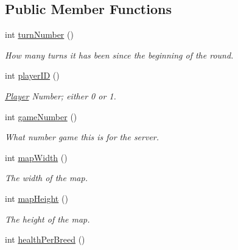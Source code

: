 \subsection*{\-Public \-Member \-Functions}
\begin{DoxyCompactItemize}
\item 
\hypertarget{classBaseAI_a19ade7391bfe101884a35f48fb840199}{int \hyperlink{classBaseAI_a19ade7391bfe101884a35f48fb840199}{turn\-Number} ()}\label{classBaseAI_a19ade7391bfe101884a35f48fb840199}

\begin{DoxyCompactList}\small\item\em \-How many turns it has been since the beginning of the round. \end{DoxyCompactList}\item 
\hypertarget{classBaseAI_a16aab1036653c8f8fb5370cf2f6a3e10}{int \hyperlink{classBaseAI_a16aab1036653c8f8fb5370cf2f6a3e10}{player\-I\-D} ()}\label{classBaseAI_a16aab1036653c8f8fb5370cf2f6a3e10}

\begin{DoxyCompactList}\small\item\em \hyperlink{classPlayer}{\-Player} \-Number; either 0 or 1. \end{DoxyCompactList}\item 
\hypertarget{classBaseAI_a50d3091db33b93c6f7c2d11dd64b4c7a}{int \hyperlink{classBaseAI_a50d3091db33b93c6f7c2d11dd64b4c7a}{game\-Number} ()}\label{classBaseAI_a50d3091db33b93c6f7c2d11dd64b4c7a}

\begin{DoxyCompactList}\small\item\em \-What number game this is for the server. \end{DoxyCompactList}\item 
\hypertarget{classBaseAI_acef275d421ba8018d14071a1383b3769}{int \hyperlink{classBaseAI_acef275d421ba8018d14071a1383b3769}{map\-Width} ()}\label{classBaseAI_acef275d421ba8018d14071a1383b3769}

\begin{DoxyCompactList}\small\item\em \-The width of the map. \end{DoxyCompactList}\item 
\hypertarget{classBaseAI_aab7aa00684066902ce65247ea7d86ff5}{int \hyperlink{classBaseAI_aab7aa00684066902ce65247ea7d86ff5}{map\-Height} ()}\label{classBaseAI_aab7aa00684066902ce65247ea7d86ff5}

\begin{DoxyCompactList}\small\item\em \-The height of the map. \end{DoxyCompactList}\item 
\hypertarget{classBaseAI_a1cb2d2fe7d5037b0fc7b15fc9974549a}{int \hyperlink{classBaseAI_a1cb2d2fe7d5037b0fc7b15fc9974549a}{health\-Per\-Breed} ()}\label{classBaseAI_a1cb2d2fe7d5037b0fc7b15fc9974549a}


\end{DoxyCompactItemize}

